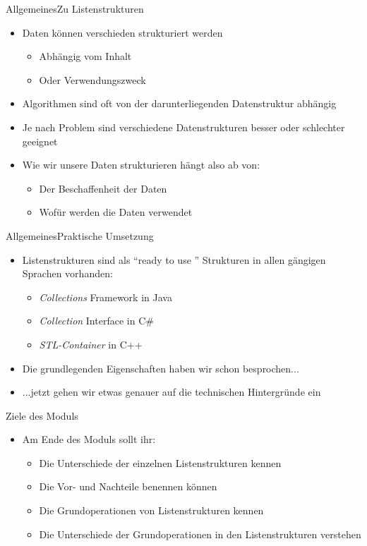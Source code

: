 \begin{frame}{Allgemeines}{Zu Listenstrukturen}
	\begin{itemize}
		\item Daten können verschieden strukturiert werden
		\begin{itemize}
			\item Abhängig vom Inhalt
			\item Oder Verwendungszweck
		\end{itemize}
		\item Algorithmen sind oft von der darunterliegenden Datenstruktur abhängig
		\item Je nach Problem sind verschiedene Datenstrukturen besser oder schlechter geeignet
		\item Wie wir unsere Daten strukturieren hängt also ab von:
		\begin{itemize}
			\item Der Beschaffenheit der Daten
			\item Wofür werden die Daten verwendet
		\end{itemize}
	\end{itemize}
\end{frame}

\begin{frame}{Allgemeines}{Praktische Umsetzung}
	\begin{itemize}
		\item Listenstrukturen sind als "`ready to use "' Strukturen in allen gängigen Sprachen vorhanden:
		\begin{itemize}
			\item \textit{Collections} Framework in Java
			\item \textit{Collection} Interface in C\#
			\item \textit{STL-Container} in C++
		\end{itemize}
		\item Die grundlegenden Eigenschaften haben wir schon besprochen...
		\item ...jetzt gehen wir etwas genauer auf die technischen Hintergründe ein
	\end{itemize}
\end{frame}

\begin{frame}{Ziele des Moduls}
	\begin{itemize}
		\item Am Ende des Moduls sollt ihr:
		\begin{itemize}
			\item Die Unterschiede der einzelnen Listenstrukturen kennen
			\item Die Vor- und Nachteile benennen können
			\item Die Grundoperationen von Listenstrukturen kennen
			\item Die Unterschiede der Grundoperationen in den Listenstrukturen verstehen
		\end{itemize}
	\end{itemize}
\end{frame}

